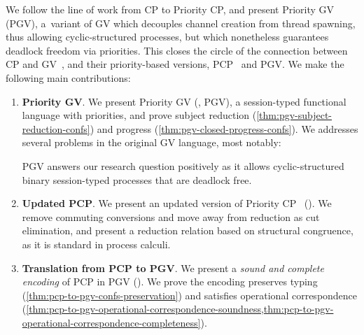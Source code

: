 \documentclass[main.tex]{subfiles}
\begin{document}
We follow the line of work from CP to Priority CP, and present Priority GV (PGV), a~variant of GV which decouples channel creation from thread spawning, thus allowing cyclic-structured processes, but which nonetheless guarantees deadlock freedom via priorities. This closes the circle of the connection between CP and GV~\cite{wadler14}, and their priority-based versions, PCP~\cite{dardhagay18} and PGV.
We make the following main contributions:
\begin{enumerate}
\item \textbf{Priority GV}. We present Priority GV (, PGV), a session-typed functional language with priorities, and prove subject reduction (\cref{thm:pgv-subject-reduction-confs}) and progress (\cref{thm:pgv-closed-progress-confs}). We addresses several problems in the original GV language, most notably:
  PGV answers our research question positively as it allows cyclic-structured binary session-typed processes that are deadlock free.
\item \textbf{Updated PCP}. We present an updated version of Priority CP~\cite{dardhagay18} (). We remove commuting conversions and move away from reduction as cut elimination, and present a reduction relation based on structural congruence, as it is standard in process calculi.
\item \textbf{Translation from PCP to PGV}. We present a \emph{sound and complete encoding} of PCP in PGV (). We prove the encoding preserves typing (\cref{thm:pcp-to-pgv-confs-preservation}) and satisfies operational correspondence (\cref{thm:pcp-to-pgv-operational-correspondence-soundness,thm:pcp-to-pgv-operational-correspondence-completeness}).
\end{enumerate}
\end{document}
